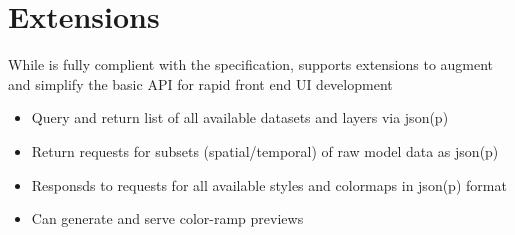 \documentclass[noback,noborder,portrait,twocolumn]{cuposter}
\begin{document}
\section{\wms{} Extensions}

While \sciwms{} is fully complient with the \ogc{} \wms{}
specification, \sciwms{} supports extensions to augment and simplify
the basic \wms{} API for rapid front end UI development

\begin{itemize}
  \item Query and return list of all available datasets and layers via
    json(p)

  \item Return requests for subsets (spatial/temporal) of raw model
    data as json(p)
    
  \item Responsds to requests for all available styles and colormaps
    in json(p) format
    
  \item Can generate and serve color-ramp previews
\end{itemize}
\end{document}
